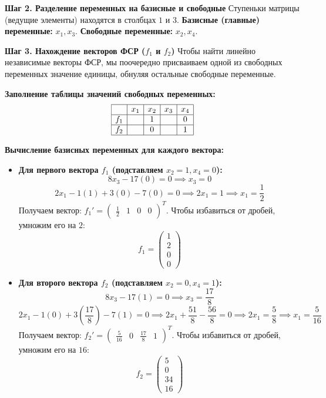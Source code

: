 \noindent\textbf{Шаг 2. Разделение переменных на базисные и свободные}
Ступеньки матрицы (ведущие элементы) находятся в столбцах $1$ и $3$. 
\textbf{Базисные (главные) переменные:} $x_1, x_3$.
\textbf{Свободные переменные:} $x_2, x_4$.

\noindent\textbf{Шаг 3. Нахождение векторов ФСР ($f_1$ и $f_2$)}
Чтобы найти линейно независимые векторы ФСР, мы поочередно присваиваем одной из свободных переменных значение единицы, обнуляя остальные свободные переменные.

\noindent
\textbf{Заполнение таблицы значений свободных переменных:}
\[
\begin{array}{|c|c|c|c|c|}
\hline
    & x_1 & x_2 & x_3 & x_4 \\ \hline
f_1 &     &  1  &     &  0  \\ \hline
f_2 &     &  0  &     &  1  \\ \hline
\end{array}
\]

\noindent
\textbf{Вычисление базисных переменных для каждого вектора:}
\begin{itemize}
    \item \textbf{Для первого вектора $f_1$ (подставляем $x_2 = 1, x_4 = 0$):}
    \[ 
    8x_3 - 17(0) = 0 \implies x_3 = 0 
    \]
    \[ 
    2x_1 - 1(1) + 3(0) - 7(0) = 0 \implies 2x_1 = 1 \implies x_1 = \frac{1}{2} 
    \]
    Получаем вектор: $f_1' = \begin{pmatrix} \frac{1}{2} & 1 & 0 & 0 \end{pmatrix}^T$. Чтобы избавиться от дробей, умножим его на $2$:
    \[
    f_1 = \begin{pmatrix} 1 \\ 2 \\ 0 \\ 0 \end{pmatrix}
    \]
    
    \item \textbf{Для второго вектора $f_2$ (подставляем $x_2 = 0, x_4 = 1$):}
    \[ 
    8x_3 - 17(1) = 0 \implies x_3 = \frac{17}{8} 
    \]
    \[ 
    2x_1 - 1(0) + 3\left(\frac{17}{8}\right) - 7(1) = 0 \implies 2x_1 + \frac{51}{8} - \frac{56}{8} = 0 \implies 2x_1 = \frac{5}{8} \implies x_1 = \frac{5}{16} 
    \]
    Получаем вектор: $f_2' = \begin{pmatrix} \frac{5}{16} & 0 & \frac{17}{8} & 1 \end{pmatrix}^T$. Чтобы избавиться от дробей, умножим его на $16$:
    \[
    f_2 = \begin{pmatrix} 5 \\ 0 \\ 34 \\ 16 \end{pmatrix}
    \]
\end{itemize}

